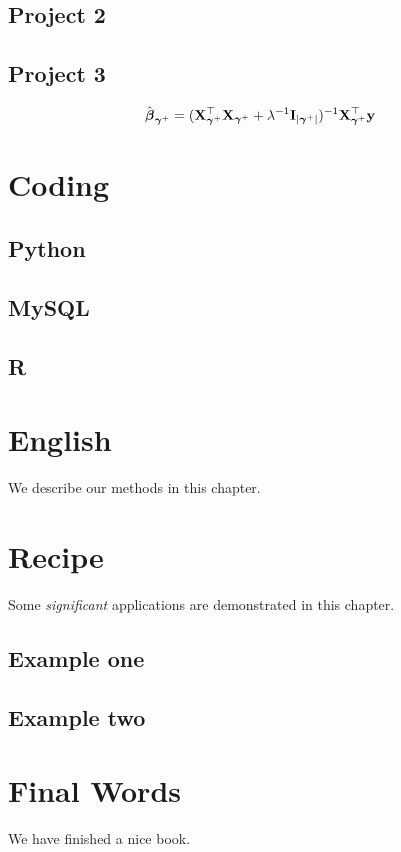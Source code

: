 \documentclass[
]{book}
\begin{document}
\hypertarget{project-2}{%
\section{Project 2}\label{project-2}}

\hypertarget{project-3}{%
\section{Project 3}\label{project-3}}

\[\hat{\boldsymbol \beta}_{{\boldsymbol \gamma}^+} = ({\bf X}_{{\boldsymbol \gamma}^+}^{{ \top}}{\bf X}_{{\boldsymbol \gamma}^+}+\lambda^{-1}{\bf I}_{|{{\boldsymbol \gamma}^+}|})^{-1}{\bf X}_{{\boldsymbol \gamma}^+}^{{ \top}}{\bf y}\]

\hypertarget{coding}{%
\chapter{Coding}\label{coding}}

\hypertarget{python}{%
\section{Python}\label{python}}

\hypertarget{mysql}{%
\section{MySQL}\label{mysql}}

\hypertarget{r}{%
\section{R}\label{r}}

\hypertarget{english}{%
\chapter{English}\label{english}}

We describe our methods in this chapter.

\hypertarget{recipe}{%
\chapter{Recipe}\label{recipe}}

Some \emph{significant} applications are demonstrated in this chapter.

\hypertarget{example-one}{%
\section{Example one}\label{example-one}}

\hypertarget{example-two}{%
\section{Example two}\label{example-two}}

\hypertarget{final-words}{%
\chapter{Final Words}\label{final-words}}

We have finished a nice book.

  
\end{document}
